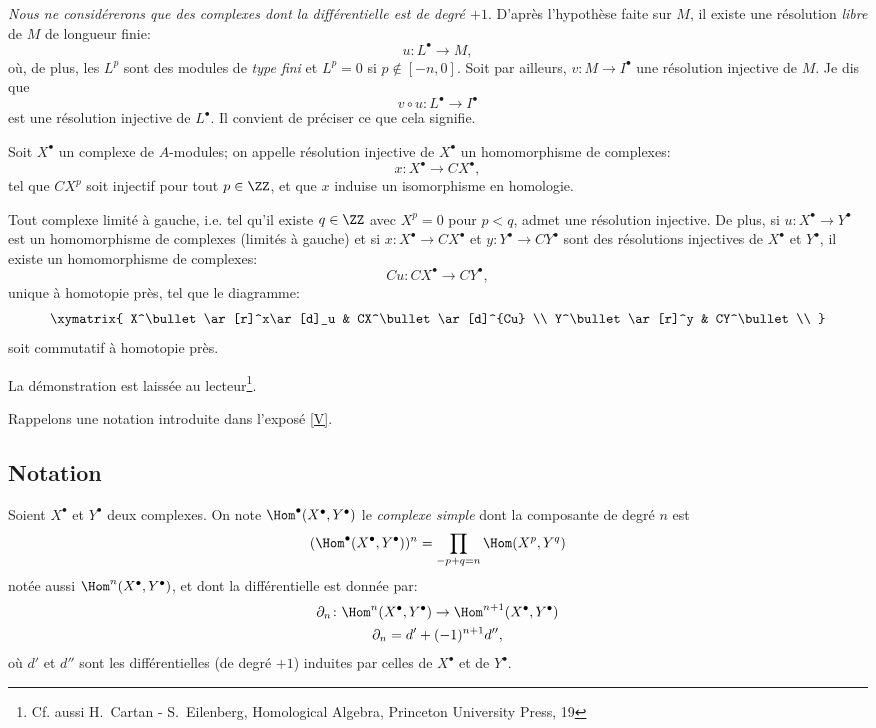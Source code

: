 \emph{Nous ne considérerons que des complexes dont la différentielle est de degré $+1$}. D'apr\`es l'hypoth\`ese faite sur $M$, il existe une r\'esolution \emph{libre} de $M$ de longueur finie:
\[u\colon L^\bullet \to M, \]
o\`u, de plus, les $L^p$ sont des modules de \emph{type fini} et $L^p=0$ si $p\not\in[-n, 0]$. Soit par ailleurs, $v\colon M\to I^\bullet$ une r\'esolution injective de $M$. Je dis que
\begin{equation} \label{eq:VIII.1.1} v\circ u\colon L^\bullet\to I^\bullet
\end{equation}
est une r\'esolution injective de $L^\bullet$. Il convient de pr\'eciser ce que cela signifie.

\begin{definition} \label{VIII.1.3} Soit $X^\bullet$ un complexe de $A$-modules; on appelle r\'esolution injective de $X^\bullet$ un homomorphisme de complexes:
\[x\colon X^\bullet\to CX^\bullet, \]
tel que $CX^p$ soit injectif pour tout $p\in \ZZ$, et que $x$ induise un isomorphisme en homologie.
\end{definition}

\begin{proposition} \label{VIII.1.4} Tout complexe limit\'e \`a gauche, i.e. tel qu'il existe $q\in\ZZ$ avec $X^p=0$ pour $p<q$, admet une r\'esolution injective. De plus, si $u\colon X^\bullet\to Y^\bullet$ est un homomorphisme de complexes (limit\'es \`a gauche) et si $x\colon X^\bullet \to CX^\bullet$ et $y\colon Y^\bullet\to CY^\bullet$ sont des r\'esolutions injectives de $X^\bullet$ et $Y^\bullet$, il existe un homomorphisme de complexes:
\[Cu\colon CX^\bullet\to CY^\bullet, \]
unique \`a homotopie pr\`es, tel que le diagramme:
\[
\xymatrix{ X^\bullet \ar[r]^x\ar[d]_u & CX^\bullet\ar[d]^{Cu} \\
Y^\bullet \ar[r]^y & CY^\bullet \\
}\]
soit commutatif \`a homotopie pr\`es.
\end{proposition}

La d\'emonstration est laiss\'ee au lecteur\footnote{Cf. aussi H.~Cartan - S.~Eilenberg, Homological Algebra, Princeton University Press, 19}.

Rappelons une notation introduite dans l'expos\'e \ref{V}.

\subsection*{Notation}
Soient $X^\bullet$ et $Y^\bullet$ deux complexes. On note $\Hom^\bullet(X^\bullet, Y^\bullet)$ le \emph{complexe simple} dont la composante de degr\'e $n$ est
\[(\Hom^\bullet(X^\bullet, Y^\bullet))^n=\prod_{-p+q=n}\Hom(X^p, Y^q)\]
not\'ee aussi $\Hom^n(X^\bullet, Y^\bullet)$, et dont la diff\'erentielle est donn\'ee par:
\begin{gather*}
\partial_n\colon \Hom^n(X^\bullet, Y^\bullet)\to \Hom^{n+1}(X^\bullet, Y^\bullet)\\
\partial_n=d'+(-1)^{n+1}d'',
\end{gather*}
o\`u $d'$ et $d''$ sont les diff\'erentielles (de degr\'e $+1$) induites par celles de $X^\bullet$ et de $Y^\bullet$.

